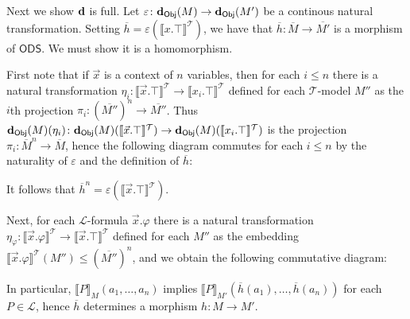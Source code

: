 \documentclass{article}
\theoremstyle{plain}
\def\cal#1{{\mathcal #1}}
\def\calL{{\cal L}}
\def\calT{{\cal T}}
\newcommand{\ODS}{{\mathsf{ODS}}}
\newcommand{\y}{{\mathsf{\bf d}}}
\newcommand{\Obj}{\mathsf{Obj}}
\begin{document}
Next we show $\y$ is full. Let $\varepsilon\colon \y_\Obj(M) \to \y_\Obj(M')$ be a continous natural transformation. Setting $\overline{h} = \varepsilon(\llbracket x.\top\rrbracket^\calT)$, we have that $\overline{h}\colon \overline{M}\to\overline{M'}$ is a morphism of $\ODS$. We must show it is a homomorphism.

First note that if $\vec{x}$ is a context of $n$ variables, then for each $i\leq n$ there is a natural transformation $\eta_i \colon \llbracket \vec{x}.\top \rrbracket^\calT \to \llbracket x_i.\top\rrbracket^\calT$ defined for each $\calT$-model $M''$ as the $i$th projection $\pi_i\colon (\overline{M''})^n \to \overline{M''}$. Thus $\y_\Obj(M)(\eta_i) \colon \y_\Obj(M)(\llbracket \vec{x}.\top\rrbracket^\calT) \to \y_\Obj(M)(\llbracket x_i.\top\rrbracket^\calT)$ is the projection $\pi_i\colon \overline{M}^n \to \overline{M}$, hence the following diagram commutes for each $i\leq n$ by the naturality of $\varepsilon$ and the definition of $\overline{h}$:
\begin{center}
\end{center}
It follows that $\overline{h}^n=\varepsilon(\llbracket \vec{x}.\top\rrbracket^\calT)$. 

Next, for each $\calL$-formula $\vec{x}.\varphi$ there is a natural transformation $\eta_\varphi \colon \llbracket \vec{x}.\varphi \rrbracket^\calT \to \llbracket \vec{x}.\top\rrbracket^\calT$ defined for each $M''$ as the embedding $\llbracket \vec{x}.\varphi \rrbracket^\calT(M'') \leq (\overline{M''})^n$, and we obtain the following commutative diagram:
\begin{center}
\end{center}
In particular, $\llbracket P\rrbracket_M(a_1,\ldots,a_n)$ implies $\llbracket P\rrbracket_{M'}(\overline{h}(a_1),\ldots,\overline{h}(a_n))$ for each $P\in\calL$, hence $\overline{h}$ determines a morphism $h\colon M\to M'$.
\end{document}
